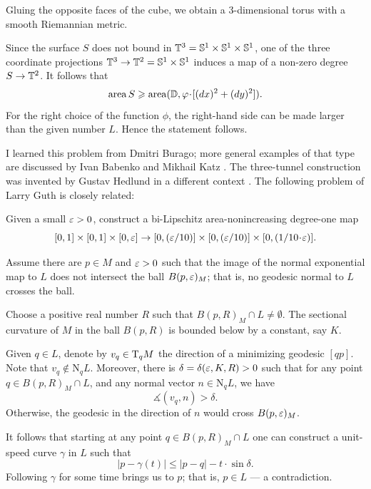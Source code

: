 Gluing the opposite faces of the cube, we obtain a 3-dimensional torus with a smooth Riemannian metric.

Since the surface $S$ does not bound in $\mathbb{T}^3=\mathbb{S}^1\times\mathbb{S}^1\times\mathbb{S}^1$,
one of the three coordinate projections $\mathbb{T}^3\to\mathbb{T}^2=\mathbb{S}^1\times\mathbb{S}^1$
induces a map of a non-zero degree $S\to\mathbb{T}^2$.
It follows that 
\[\area S\ge  \area(\DD,\phi\cdot [(dx)^2+ (dy)^2]).\]
For the right choice of the function $\phi$, the right-hand side can be made larger than the given number $L$.
Hence the statement follows.
\qeds

I learned this problem from Dmitri Burago; more general examples of that type are discussed by Ivan Babenko and Mikhail Katz \cite{babenko-katz}.
The three-tunnel construction was invented by Gustav Hedlund in a different context \cite{hedlund,bangert1990}.
The following problem of Larry Guth \cite{guth} is closely related:

\begin{pr}
Given a small $\varepsilon>0$, construct a bi-Lipschitz area-nonincreasing degree-one map 
\[[0,1]\times[0,1]\times [0,\eps]\to [0,\tfrac\eps{10}]\times [0,\tfrac\eps{10}]\times [0,\tfrac1{10\cdot\eps}].\]

\end{pr}


 
Assume there are $p\in M$ and $\varepsilon>0$ 
such that the image of the normal exponential map to $L$
 does not intersect the ball $B(p,\varepsilon)_M$; that is, no geodesic normal to $L$ crosses the ball.

Choose a positive real number $R$ such that $B(p,R)_M\cap L\ne \emptyset$.
The sectional curvature of $M$ in the ball $B(p,R)$
is bounded below by a constant, say $K$.

Given $q\in L$, denote by $v_q \in \mathrm{T}_qM$ the direction of a minimizing geodesic $[qp]$.
Note that $v_q\notin \mathrm{N}_qL$.
Moreover, there is $\delta=\delta(\eps,K,R)\z>0$ 
such that for any point $q\in B(p,R)_M\cap L$,
and any normal vector $n\in \mathrm{N}_qL$,
we have 
\[\measuredangle (v_q,n)>\delta.\]
Otherwise, the geodesic in the direction of $n$ would cross $B(p,\varepsilon)_M$.

It follows that starting at any point $q\in B(p,R)_M\cap L$ 
one can construct a unit-speed curve $\gamma$ in $L$ such that 
\[|p-\gamma(t)|\le |p-q|-t\cdot\sin \delta.\]
Following $\gamma$ for some time brings us to $p$;
that is, $p\in L$ --- a contradiction.
\qeds


